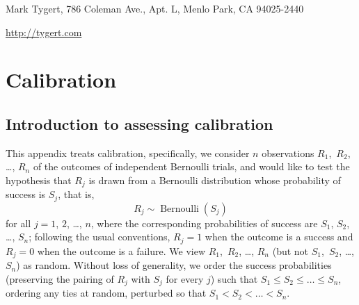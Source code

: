 \documentclass{article}
\DeclareMathOperator{\Bernoulli}{Bernoulli}
\begin{document}
\noindent Mark Tygert, 786 Coleman Ave., Apt. L, Menlo Park, CA 94025-2440


\noindent \url{http://tygert.com}



\clearpage



\appendix
\section{Calibration}
\label{calibration}


\subsection{Introduction to assessing calibration}
\label{aintro}

This appendix treats calibration, specifically,
we consider $n$ observations $R_1$,~$R_2$, \dots, $R_n$ of the outcomes
of independent Bernoulli trials, and would like to test the hypothesis
that $R_j$ is drawn from a Bernoulli distribution whose probability of success
is $S_j$, that is,
%
\begin{equation}
\label{null}
R_j \sim \Bernoulli(S_j)
\end{equation}
%
for all $j = 1$, $2$, \dots, $n$, where the corresponding probabilities
of success are $S_1$, $S_2$, \dots, $S_n$;
following the usual conventions, $R_j = 1$ when the outcome is a success
and $R_j = 0$ when the outcome is a failure.
We view $R_1$,~$R_2$, \dots, $R_n$ (but not $S_1$,~$S_2$, \dots, $S_n$)
as random. Without loss of generality, we order the success probabilities
(preserving the pairing of $R_j$ with $S_j$ for every $j$)
such that $S_1 \le S_2 \le \dots \le S_n$, ordering any ties at random,
perturbed so that $S_1 < S_2 < \dots < S_n$.
\end{document}
